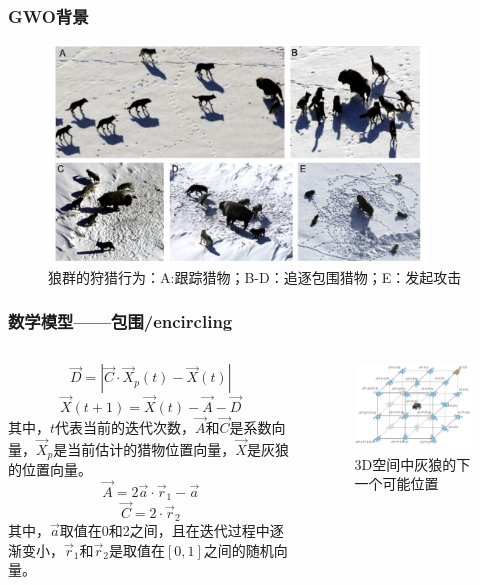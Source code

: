 \begin{frame}
	\frametitle{GWO背景}
		\begin{figure}[htbp]
			\centering
			\includegraphics[width=10cm]{pic/wolf2.png}
			\caption{狼群的狩猎行为：A:跟踪猎物；B-D：追逐包围猎物；E：发起攻击}
		\end{figure}
\end{frame}


\begin{frame}
	\frametitle{数学模型——包围/encircling}
	\begin{columns}
		\begin{equation}
			\vec{D}=|\vec{C} \cdot \vec{X}_{p}(t)-\vec{X}(t)|
		\end{equation}
		\begin{equation}
		\vec{X}(t+1)=\vec{X}(t)-\vec{A}-\vec{D}
		\end{equation}
		其中，$t$代表当前的迭代次数，$\vec{A}$和$\vec{C}$是系数向量，$\vec{X}_p$是当前估计的猎物位置向量，$\vec{X}$是灰狼的位置向量。
		\begin{equation}
			\vec{A}=2\vec{a} \cdot \vec{r}_{1}-\vec{a}
		\end{equation}
		\begin{equation}
		\vec{C}=2 \cdot \vec{r}_2
		\end{equation}
		其中，$\vec{a}$取值在0和2之间，且在迭代过程中逐渐变小，$\vec{r}_1$和$\vec{r}_2$是取值在$[0,1]$之间的随机向量。
		\begin{figure}[htbp]
			\centering
			\includegraphics[width=7cm]{pic/wolf3.png}
			\caption{3D空间中灰狼的下一个可能位置}
		\end{figure}
	\end{columns}
\end{frame}


